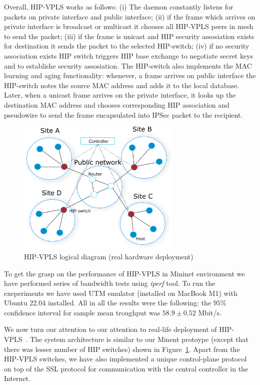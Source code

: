 Overall, HIP-VPLS works as follows: (i) The daemon constantly listens for packets on private interface 
and public interface; (ii) if the frame which arrives on private interface is broadcast or multicast it chooses all 
HIP-VPLS peers in mesh to send the packet; 
(iii) if the frame is unicast and HIP security assosiation exists for destination it sends the packet to the selected
HIP-switch; (iv) if no security association exists HIP switch triggers HIP base exchange to negotiate 
secret keys and to establishe security assosiation. The HIP-switch also implements the MAC learning and aging 
functionality: whenever, a frame arrives on public interface the HIP-switch notes the source MAC address 
and adds it to the local database. Later, when a unicast frame arrives on the private interface, 
it looks up the destination MAC address and chooses corresponding HIP association and pseudowire to send
the frame encapsulated into IPSec packet to the recipient. 


\begin{figure}[h!]
    \centering
    \includegraphics[width=0.7\textwidth]{graphics/hw-hipls.png}
    \caption{HIP-VPLS logical diagram (real hardware deployment)}
    \label{fig:mininet}
\end{figure}

To get the grasp on the performance of HIP-VPLS in Mininet environment we 
have performed series of bandwidth tests using {\it iperf} tool. To run
the exeperiments we have used UTM emulator (installed on MacBook M1) 
with Ubuntu 22.04 installed. All in all the results were the following: 
the $95\%$ confidence interval for sample mean troughput was 
$58.9 \pm 0.52$ Mbit/s.

We now turn our attention to our attention to real-life deployment 
of HIP-VPLS~\cite{hipvpls-hw, hipvpls-controller}. The system architecture is similar to our Minent protoype
(except that there was lesser number of HIP switches) shown in Figure~\ref{fig:mininet}. 
Apart from the HIP-VPLS switches, we have also implemented a unique 
control-plane protocol on top of the SSL protocol for communication 
with the central controller in the Internet.

